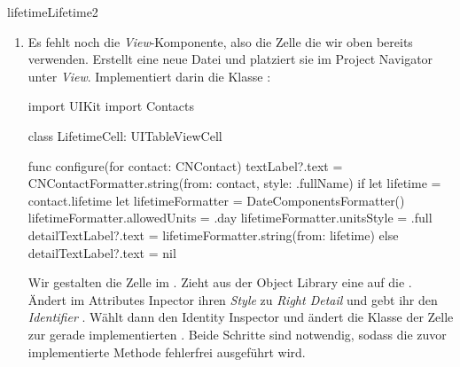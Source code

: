 \documentclass[parskip=half, final]{scrreprt}
\begin{document}
\begin{lecture}
\begin{exc}
\begin{excitem}{lifetime}{Lifetime}{2}
\begin{enumerate}
\begin{swiftcode}
{    override func tableView(_ tableView: UITableView, cellForRowAt indexPath: IndexPath) -> UITableViewCell {
        // VIEW-Komponente: Frage die Table View nach einer wiederverwendbaren Zelle
        let cell = tableView.dequeueReusableCell(withIdentifier: "LifetimeCell", for: indexPath) as! LifetimeCell
        // MODEL-Komponente: Bestimme den Kontakt für diese Zeile
        let contact = contacts[indexPath.row]
        // CONTROLLER-Komponente: Konfiguriere die Zelle für den Kontakt
        cell.configure(for: contact)
        if let _ = contact.lifetime {
            cell.selectionStyle = .default
            cell.accessoryType = .disclosureIndicator
        } else {
            cell.selectionStyle = .none
            cell.accessoryType = .none
        }
        return cell
    }

}
\end{swiftcode}

\item Es fehlt noch die \mvcindicatorview\emph{View}-Komponente, also die Zelle die wir oben bereits verwenden. Erstellt eine neue Datei  und platziert sie im Project Navigator unter \emph{View}. Implementiert darin die Klasse :

\begin{swiftcode}
import UIKit
import Contacts

class LifetimeCell: UITableViewCell {
    
    func configure(for contact: CNContact) {
        textLabel?.text = CNContactFormatter.string(from: contact, style: .fullName)
        if let lifetime = contact.lifetime {
            let lifetimeFormatter = DateComponentsFormatter()
            lifetimeFormatter.allowedUnits = .day
            lifetimeFormatter.unitsStyle = .full
            detailTextLabel?.text = lifetimeFormatter.string(from: lifetime)
        } else {
            detailTextLabel?.text = nil
        }
    }
    
}
\end{swiftcode}

Wir gestalten die Zelle im . Zieht aus der Object Library eine  auf die . Ändert im Attributes Inpector ihren \emph{Style} zu \emph{Right Detail} und gebt ihr den \emph{Identifier} . Wählt dann den Identity Inspector und ändert die Klasse der Zelle zur gerade implementierten . Beide Schritte sind notwendig, sodass die zuvor implementierte  Methode fehlerfrei ausgeführt wird.


\end{enumerate}
\end{excitem}
\end{exc}
\end{lecture}
\end{document}
